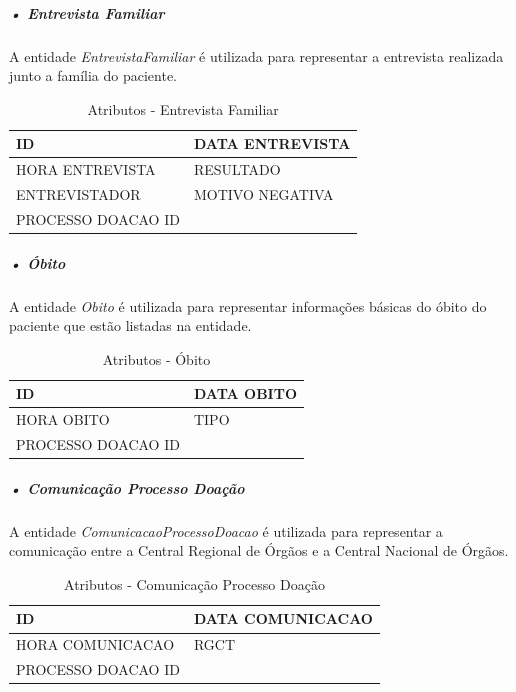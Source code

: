 \documentclass[portuguese,oneside]{tcc}
\begin{document}
\subparagraph{• Entrevista Familiar}
A entidade \textit{EntrevistaFamiliar} é utilizada para representar a entrevista realizada junto a família do paciente.


\begin{table}
\centering
\caption{Atributos - Entrevista Familiar} \label{table:atr-entrevista-familiar}
\begin{tabular}{ |p{6cm}|p{6cm}| }

\hline
ID & DATA ENTREVISTA\\
\hline
HORA ENTREVISTA & RESULTADO\\
\hline
ENTREVISTADOR & MOTIVO NEGATIVA\\
\hline
PROCESSO DOACAO ID & \\
\hline

\end{tabular}
\end{table}


\subparagraph{• Óbito}
A entidade \textit{Obito} é utilizada para representar informações básicas do óbito do paciente que estão listadas na entidade.

\begin{table}
\centering
\caption{Atributos - Óbito} \label{table:atr-obito}
\begin{tabular}{ |p{6cm}|p{6cm}| }

\hline
ID & DATA OBITO\\
\hline
HORA OBITO & TIPO\\
\hline
PROCESSO DOACAO ID & \\
\hline

\end{tabular}
\end{table}


\subparagraph{• Comunicação Processo Doação}
A entidade \textit{ComunicacaoProcessoDoacao} é utilizada para representar a comunicação entre a Central Regional de Órgãos e a Central Nacional de Órgãos.

\begin{table}
\centering
\caption{Atributos - Comunicação Processo Doação} \label{table:atr-comunicacao-processo-doacao}
\begin{tabular}{ |p{6cm}|p{6cm}| }

\hline
ID & DATA COMUNICACAO\\
\hline
HORA COMUNICACAO & RGCT\\
\hline
PROCESSO DOACAO ID & \\
\hline

\end{tabular}
\end{table}
\end{document}
